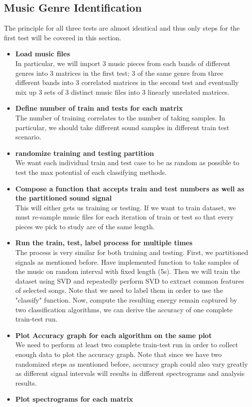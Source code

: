 \documentclass[11pt,a4paper]{article}
\numberwithin{equation}{subsection}
\begin{document}
\subsection{Music Genre Identification}
The principle for all three tests are almost identical and thus only steps for the first test will be covered in this section.
\begin{itemize}
\item[] \textbf{Load music files}\\
In particular, we will import 3 music pieces from each bands of different genres into 3 matrices in the first test; 3 of the same genre from three different bands into 3 correlated matrices in the second test and eventually mix up 3 sets of 3 distinct music files into 3 linearly unrelated matrices.
\item[] \textbf{Define number of train and tests for each matrix}\\
The number of training correlates to the number of taking samples. In particular, we should take different sound samples in different train test scenario.
\item[] \textbf{randomize training and testing partition}\\
We want each individual train and test case to be as random as possible to test the max potential of each classifying methods.
\item[] \textbf{Compose a function that accepts train and test numbers as well as the partitioned sound signal}\\
This will either gets us training or testing. If we want to train dataset, we must re-sample music files for each iteration of train or test so that every pieces we pick to study are of the same length.
\item[] \textbf{Run the train, test, label process for multiple times}\\
The process is very similar for both training and testing. First, we partitioned signals as mentioned before. Have implemented function to take samples of the music on random interval with fixed length (5s). Then we will train the dataset using SVD and repeatedly perform SVD to extract common features of selected songs. Note that we need to label them in order to use the "classify" function. Now, compute the resulting energy remain captured by two classification algorithms, we can derive the accuracy of one complete train-test run.
\item[] \textbf{Plot Accuracy graph for each algorithm on the same plot}\\
We need to perform at least two complete train-test run in order to collect enough data to plot the accuracy graph. Note that since we have two randomized steps as mentioned before, accuracy graph could also vary greatly as different signal intervals will results in different spectrograms and analysis results.
\item[] \textbf{Plot spectrograms for each matrix}
\end{itemize}
\end{document}

